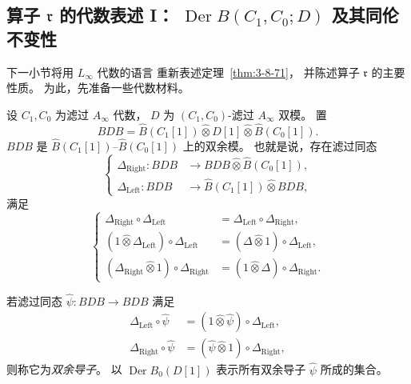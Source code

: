 
\subsection{算子 $\mathfrak r$ 的代数表述 I：
$\operatorname{Der}B(C_1,C_0;D)$ 及其同伦不变性}
\label{subsec:7-4-7}

下一小节将用 $L_\infty$ 代数的语言
重新表述定理~\ref{thm:3-8-71}，
并陈述算子 $\mathfrak r$ 的主要性质。
为此，先准备一些代数材料。

设 $C_1,C_0$ 为滤过 $A_\infty$ 代数，
$D$ 为 $(C_1,C_0)$-滤过 $A_\infty$ 双模。
置
\begin{equation}
BDB=
\widehat B(C_1[1])\widehat\otimes
D[1]\widehat\otimes
\widehat B(C_0[1]).
\tag{7.4.138}\label{eq:7-4-138}
\end{equation}
$BDB$ 是
$\widehat B(C_1[1])$--$\widehat B(C_0[1])$
上的双余模。
也就是说，存在滤过同态
\begin{equation}
\left\{
\begin{aligned}
\Delta_{\mathrm{Right}}\colon
BDB&\longrightarrow
BDB\widehat\otimes\widehat B(C_0[1]),\\
\Delta_{\mathrm{Left}}\colon
BDB&\longrightarrow
\widehat B(C_1[1])\widehat\otimes BDB,
\end{aligned}
\right.
\tag{7.4.139}\label{eq:7-4-139}
\end{equation}
满足
\begin{equation}
\left\{
\begin{aligned}
\Delta_{\mathrm{Right}}\circ\Delta_{\mathrm{Left}}
&=\Delta_{\mathrm{Left}}\circ\Delta_{\mathrm{Right}},\\
(1\widehat\otimes\Delta_{\mathrm{Left}})
\circ\Delta_{\mathrm{Left}}
&=(\Delta\widehat\otimes1)
\circ\Delta_{\mathrm{Left}},\\
(\Delta_{\mathrm{Right}}\widehat\otimes1)
\circ\Delta_{\mathrm{Right}}
&=(1\widehat\otimes\Delta)
\circ\Delta_{\mathrm{Right}}.
\end{aligned}
\right.
\tag{7.4.140}\label{eq:7-4-140}
\end{equation}

若滤过同态
$\widehat\psi\colon BDB\to BDB$
满足
\[
\begin{aligned}
\Delta_{\mathrm{Left}}\circ\widehat\psi
&=(1\widehat\otimes\widehat\psi)
\circ\Delta_{\mathrm{Left}},\\
\Delta_{\mathrm{Right}}\circ\widehat\psi
&=(\widehat\psi\widehat\otimes1)
\circ\Delta_{\mathrm{Right}},
\end{aligned}
\]
则称它为\emph{双余导子}。
以 $\operatorname{Der}B_0(D[1])$
表示所有双余导子 $\widehat\psi$ 所成的集合。

